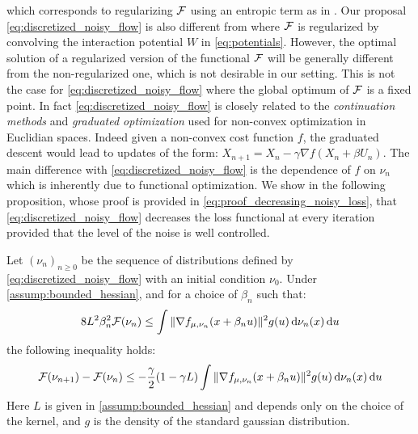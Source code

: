 which corresponds to regularizing ${{\mathcal F}}$ using an entropic term as in \cite{mei2018mean,Simsekli:2018}. Our proposal \cref{eq:discretized_noisy_flow} is also different from \cite{craig2016blob,carrillo2019blob} where ${{\mathcal F}}$ is regularized by convolving the interaction potential $W$ in \cref{eq:potentials}. However, the optimal solution of a regularized version of the functional ${{\mathcal F}}$ will be generally different from the non-regularized one, which is not desirable in our setting. This is not the case for \cref{eq:discretized_noisy_flow} where the global optimum of ${{\mathcal F}}$ is a fixed point.  
In fact \cref{eq:discretized_noisy_flow} is  closely related to the \textit{continuation methods} \cite{Gulcehre:2016a,Gulcehre:2016,Chaudhari:2017}  and \textit{graduated optimization} \cite{Hazan:2015} used for non-convex optimization in Euclidian spaces. Indeed given a non-convex cost function $f$, the graduated descent would lead to updates of the form: $X_{n+1} = X_n - \gamma \nabla f(X_n+\beta U_n )$. The main difference with \cref{eq:discretized_noisy_flow} is the dependence of $f$ on $\nu_n$ which is inherently due to functional optimization.
We show in the following proposition, whose proof is provided in \cref{eq:proof_decreasing_noisy_loss}, that \cref{eq:discretized_noisy_flow} decreases the loss functional at every iteration provided that the level of the noise is well controlled.
\begin{proposition}\label{prop:decreasing_loss_iterations}
	Let $(\nu_n)_{n\geq 0}$ be the sequence of distributions defined by \cref{eq:discretized_noisy_flow} with an initial condition $\nu_0$. Under \cref{assump:bounded_hessian}, and for a choice of $\beta_n$ such that:
	\begin{align}\label{eq:control_level_noise}
		8L^2\beta_n^2 {{\mathcal F}}(\nu_n) \leq \int \Vert \nabla f_{\mu,\nu_n}(x+\beta_n u) \Vert^2 g(u) \mathop{}\!\mathrm{d} \nu_n(x)\mathop{}\!\mathrm{d} u   
	\end{align}
	 the following inequality holds:
	\begin{align}\label{eq:decreasing_loss_iterations}
		{{\mathcal F}}(\nu_{n+1}) - {{\mathcal F}}(\nu_n  ) \leq -\frac{\gamma}{2}(1-\gamma L)\int \Vert \nabla f_{\mu,\nu_n}(x+\beta_n u) \Vert^2 g(u) \mathop{}\!\mathrm{d}\nu_n(x) \mathop{}\!\mathrm{d} u
	\end{align}
	Here $L$ is given in \cref{assump:bounded_hessian} and depends only on the choice of the kernel, and $g$ is the density of the standard gaussian distribution.
\end{proposition}

